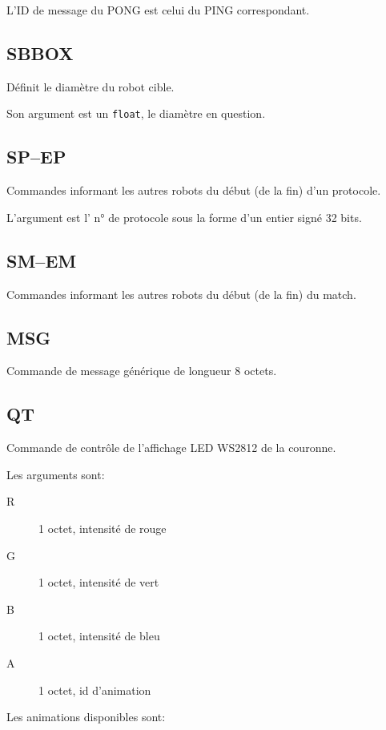 	L'ID de message du PONG est celui du PING correspondant.

\subsection{SBBOX}
	\label{subsec:SBBOX}

	Définit le diamètre du robot cible.

	Son argument est un \verb|float|, le diamètre en question.

\subsection{SP--EP}
	\label{subsec:SP-EP}

	Commandes informant les autres robots du début (de la fin) d'un protocole.

	L'argument est l' n° de protocole sous la forme d'un entier signé 32 bits.

\subsection{SM--EM}
	\label{subsec:SM-EM}

	Commandes informant les autres robots du début (de la fin) du match.

\subsection{MSG}
	\label{subsec:MSG}

	Commande de message générique de longueur 8 octets.

\subsection{QT}
	\label{subsec:QT}

	Commande de contrôle de l'affichage LED WS2812 de la couronne.

	Les arguments sont:

	\begin{description}
		\item[R] 1 octet, intensité de rouge
		\item[G] 1 octet, intensité de vert
		\item[B] 1 octet, intensité de bleu
		\item[A] 1 octet, id d'animation
	\end{description}

	Les animations disponibles sont:

